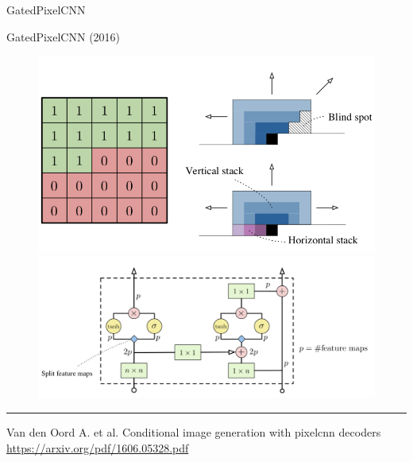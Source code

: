 

\begin{frame}
\titlepage
\end{frame}
\begin{frame}{GatedPixelCNN}
\end{frame}
\begin{frame}{GatedPixelCNN (2016)}
\begin{figure}
	\centering
	\includegraphics[width=0.5\linewidth]{figs/gatedpixelcnn.png}
	\includegraphics[width=0.5\linewidth]{figs/gated_block.png}
\end{figure}
\vfill
\hrule\medskip
{\scriptsize Van den Oord A. et al. Conditional image generation with pixelcnn decoders \href{https://arxiv.org/pdf/1606.05328.pdf}{https://arxiv.org/pdf/1606.05328.pdf}}
\end{frame}
